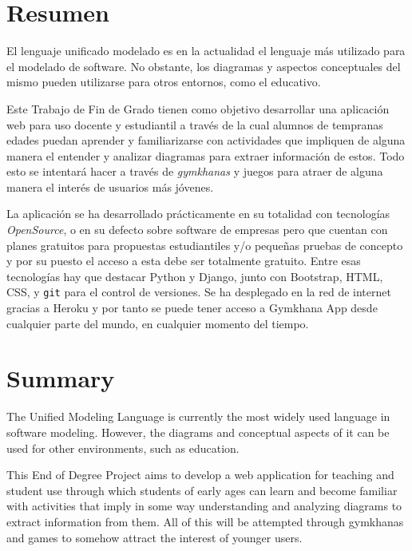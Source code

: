 \documentclass[a4paper, 12pt]{book}
\begin{document}

\chapter*{Resumen}

El lenguaje unificado modelado es en la actualidad el lenguaje más utilizado para el modelado de software. No obstante, los diagramas y aspectos conceptuales del mismo pueden utilizarse para otros entornos, como el educativo.  

Este Trabajo de Fin de Grado tienen como objetivo desarrollar una aplicación web para uso docente y estudiantil a través de la cual alumnos de tempranas edades puedan aprender y familiarizarse con actividades que impliquen de alguna manera el entender y analizar diagramas para extraer información de estos. Todo esto se intentará hacer a través de \emph{gymkhanas} y juegos para atraer de alguna manera el interés de usuarios más jóvenes.

La aplicación se ha desarrollado prácticamente en su totalidad con tecnologías \emph{OpenSource}, o en su defecto sobre software de empresas pero que cuentan con planes gratuitos para propuestas estudiantiles y/o pequeñas pruebas de concepto y por su puesto el acceso a esta debe ser totalmente gratuito. Entre esas tecnologías hay que destacar Python y Django, junto con Bootstrap, HTML, CSS, y \texttt{git} para el control de versiones. Se ha desplegado en la red de internet gracias a Heroku y por tanto se puede tener acceso a Gymkhana App desde cualquier parte del mundo, en cualquier momento del tiempo.


\chapter*{Summary}
The Unified Modeling Language is currently the most widely used language in software modeling. However, the diagrams and conceptual aspects of it can be used for other environments, such as education.

This End of Degree Project aims to develop a web application for teaching and student use through which students of early ages can learn and become familiar with activities that imply in some way understanding and analyzing diagrams to extract information from them. All of this will be attempted through gymkhanas and games to somehow attract the interest of younger users.
\end{document}
